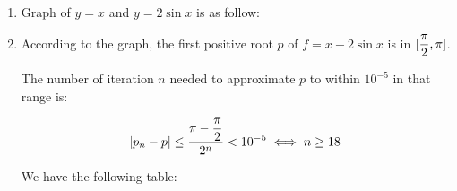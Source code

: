 \documentclass[../../Assignments.tex]{subfiles}
\begin{document}
\begin{solution}
    \begin{enumerate}[label=(\alph*)]
        \item Graph of \(y = x\) and \(y = 2 \sin{x}\) is as follow:

            \begin{figure}[hbt!]
                \centering
                
            \end{figure}

        \item According to the graph, the first positive root \(p\) of \(f = x -
            2 \sin{x}\) is in \(\interval{\dfrac{\pi}{2}}{\pi}\).

            The number of iteration \(n\) needed to approximate \(p\) to within
            \(10^{-5}\) in that range is:

            \[\abs{p_n - p} \leq \frac{\pi - \dfrac{\pi}{2}}{2^n} < 10^{-5} \iff n \geq 18\]

            We have the following table:


\end{enumerate}
\end{solution}
\end{document}
